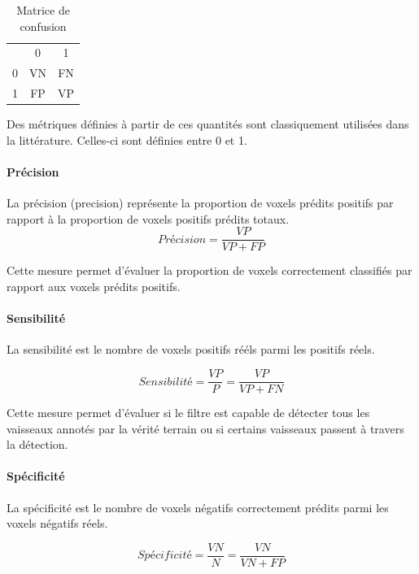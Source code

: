 \begin{table}
  \centering
  \begin{tabular}{ ccc }
    \hline
      & 0  & 1 \\
    0 & VN & FN \\
    1 & FP & VP  \\
    \hline
  \end{tabular}
  \caption{Matrice de confusion}
  \label{tab:confusion_matrix}
\end{table}

Des métriques définies à partir de ces quantités sont classiquement utilisées dans la littérature. Celles-ci sont définies entre 0 et 1.

\paragraph{Précision}
La précision (precision) représente la proportion de voxels prédits positifs par rapport à la proportion de voxels positifs prédits totaux.
\begin{equation}
  Précision = \frac{VP}{VP+FP}
\end{equation}

Cette mesure permet d'évaluer la proportion de voxels correctement classifiés par rapport aux voxels prédits positifs.

\paragraph{Sensibilité}

La sensibilité est le nombre de voxels positifs rééls parmi les positifs réels.

\begin{equation}
  Sensibilité = \frac{VP}{P} = \frac{VP}{VP+FN}
\end{equation}

Cette mesure permet d'évaluer si le filtre est capable de détecter tous les vaisseaux annotés par la vérité terrain ou si certains vaisseaux passent à travers la détection. 

\paragraph{Spécificité}

La spécificité est le nombre de voxels négatifs correctement prédits parmi les voxels négatifs réels.

\begin{equation}
  Spécificité = \frac{VN}{N} = \frac{VN}{VN+FP}
\end{equation}

